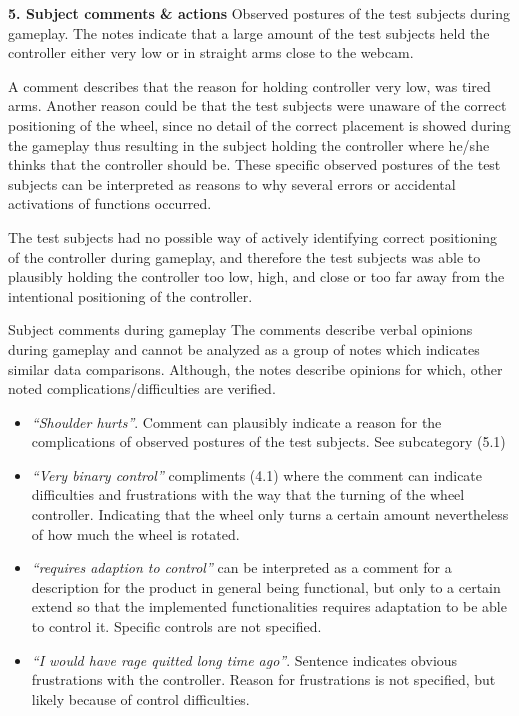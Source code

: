 \noindent\textbf{5. Subject comments \& actions}\newline
{} Observed postures of the test subjects during gameplay.\newline
The notes indicate that a large amount of the test subjects held the controller either very low or in straight arms close to the webcam.


A comment describes that the reason for holding controller very low, was tired arms. 
Another reason could be that the test subjects were unaware of the correct positioning of the wheel, since no detail of the correct placement is showed during the gameplay thus resulting in the subject holding the controller where he/she thinks that the controller should be. 
These specific observed postures of the test subjects can be interpreted as reasons to why several errors or accidental activations of functions occurred.


The test subjects had no possible way of actively identifying correct positioning of the controller during gameplay, and therefore the test subjects was able to plausibly holding the controller too low, high, and close or too far away from the intentional positioning of the controller. 
\bigskip

 Subject comments during gameplay\newline
The comments describe verbal opinions during gameplay and cannot be analyzed as a group of notes which indicates similar data comparisons. 
Although, the notes describe opinions for which, other noted complications/difficulties are verified.

\begin{itemize}
\item[] \textit{“Shoulder hurts”}. Comment can plausibly indicate a reason for the complications of observed postures of the test subjects. See subcategory ({\color{Red}5.1}) 

\item[] \textit{“Very binary control”} compliments ({\color{Red}4.1}) where the comment can indicate difficulties and frustrations with the way that the turning of the wheel controller. 
Indicating that the wheel only turns a certain amount nevertheless of how much the wheel is rotated.

\item[] \textit{“requires adaption to control”} can be interpreted as a comment for a description for the product in general being functional, but only to a certain extend so that the implemented functionalities requires adaptation to be able to control it. Specific controls are not specified.

\item[] \textit{“I would have rage quitted long time ago”}. Sentence indicates obvious frustrations with the controller. Reason for frustrations is not specified, but likely because of control difficulties.
\end{itemize}
\bigskip

